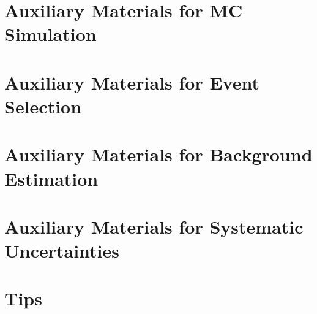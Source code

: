 \section{Auxiliary Materials for MC Simulation}
\setcounter{figure}{0}   
\setcounter{table}{0}   


\setcounter{figure}{0}   
\setcounter{table}{0}   



\clearpage
\section{Auxiliary Materials for Event Selection}
\setcounter{figure}{0}   
\setcounter{table}{0}   


\setcounter{figure}{0}  
\setcounter{table}{0}    



\clearpage
\section{Auxiliary Materials for Background Estimation}
\setcounter{figure}{0}   
\setcounter{table}{0}   
  

\setcounter{figure}{0}   
\setcounter{table}{0}   


\setcounter{figure}{0}   
\setcounter{table}{0}   


\setcounter{figure}{0}   
\setcounter{table}{0}   
  

\clearpage
\setcounter{figure}{0}   
\setcounter{table}{0}   


\clearpage
\section{Auxiliary Materials for Systematic Uncertainties}
\setcounter{figure}{0}   
\setcounter{table}{0}   

%

\clearpage
\section{Tips}
\setcounter{figure}{0}   
\setcounter{table}{0}   



%

%



